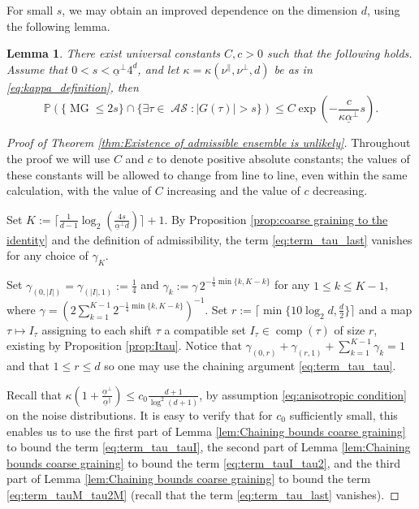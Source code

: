 \documentclass[11pt, reqno]{amsart}
\newtheorem{lemma}[theorem]{Lemma}
\DeclareMathOperator{\MG}{MG}
\DeclareMathOperator{\AS}{\mathcal{AS}}
\DeclareMathOperator{\comp}{comp}
\renewcommand{\P}{\mathbb{P}}
\numberwithin{equation}{section}
\begin{document}
For small $s$, we may obtain an improved dependence on the dimension $d$,  using the following lemma.

\begin{lemma}\label{lem:bounds without graining for small s} 
There exist universal constants $C,c>0$ such that the following holds.
Assume that $0<s < \underline{\alpha}^{\perp}4^d$, and let $\kappa=\kappa(\nu^{\parallel},\nu^{\perp},d)$ be as in \eqref{eq:kappa_definition}, then 
\begin{equation}
\P \left(\{ \MG \leq 2s \} \cap \{\exists \tau \in \AS\colon |G(\tau)|>s \} \right) \leq C\exp \left(- \frac{c}{\kappa \underline{\alpha}^{\perp}} s \right).
\end{equation}
\end{lemma}

\begin{proof}[Proof of Theorem \ref{thm:Existence of admissible ensemble is unlikely}]
Throughout the proof we will use $C$ and $c$ to denote positive absolute constants;
the values of these constants will be allowed to change from line to line, 
even within the same calculation, with the value of $C$ increasing and the value of $c$ decreasing.

Set $K:= \lceil \frac{1}{d-1} \log_2\left(\frac{4s}{\underline{\alpha}^{\perp} d }  \right) \rceil+1$. By Proposition \ref{prop:coarse graining to the identity} and the definition of admissibility,
the term \eqref{eq:term_tau_last} vanishes for any choice of $\gamma_K$.

Set $\gamma_{(0,|I|)}=\gamma_{(|I|,1)}:=\frac{1}{4}$ and $\gamma_k:= \gamma\, 2^{-\frac{1}{4}\min\{k, K-k\}}$ for any $1\leq k\leq K-1$, 
where $\gamma=\left(2\sum_{k=1}^{K-1} 2^{-\frac{1}{4}\min\{k, K-k\}}\right)^{-1}$. 
Set $r:=\lceil \min \{ 10\log_{2}d,\frac{d}{2}\}\rceil$ 
and a map $\tau\mapsto I_\tau$ assigning to each shift $\tau$ a compatible set $I_\tau \in \comp(\tau)$ of  size $r$, existing by Proposition \ref{prop:Itau}. 
Notice that $\gamma_{(0,r)}+\gamma_{(r,1)}+\sum_{k=1}^{K-1} \gamma_k =1$ and that $1 \leq r\leq d $ so one may use the chaining argument \eqref{eq:term_tau_tau}.
    
Recall that $\kappa\left(1+\frac{\underline{\alpha}^{\perp}}{\underline{\alpha}^{\parallel}} \right) \leq c_0 \frac{d+1}{ \log^{2} (d+1)} $, by assumption \eqref{eq:anisotropic condition} on the noise distributions. 
It is easy to verify that for $c_0$ sufficiently small, this enables us to use the first part of Lemma \ref{lem:Chaining bounds coarse graining} to bound the term \eqref{eq:term_tau_tauI}, 
the second part of Lemma \ref{lem:Chaining bounds coarse graining} to bound the term \eqref{eq:term_tauI_tau2}, 
and the third part of Lemma \ref{lem:Chaining bounds coarse graining} to bound the term \eqref{eq:term_tauM_tau2M} 
(recall that the term \eqref{eq:term_tau_last} vanishes).


\end{proof}
\end{document}
